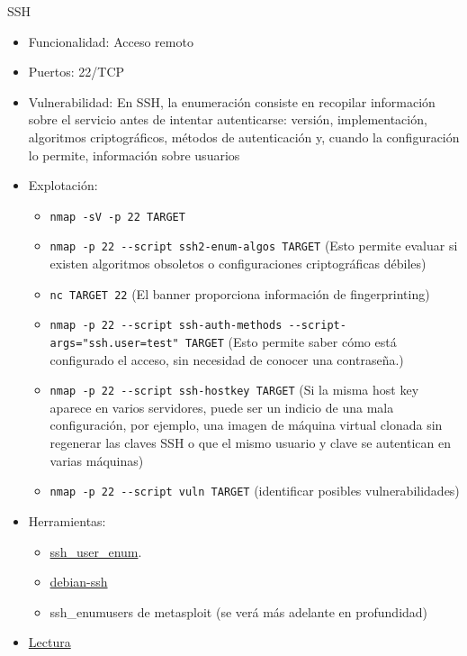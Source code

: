 \documentclass[aspectratio=169,11pt]{beamer}
\newcommand{\cmd}[1]{\texttt{#1}}
\begin{document}
\begin{frame}[allowframebreaks]{SSH}
\small
  \begin{itemize}
  \item Funcionalidad: Acceso remoto
  \item Puertos: 22/TCP
  \item Vulnerabilidad: En SSH, la enumeración consiste en recopilar información sobre el servicio antes de intentar autenticarse: versión, implementación, algoritmos criptográficos, métodos de autenticación y, cuando la configuración lo permite, información sobre usuarios
  \item Explotación:
      \begin{itemize}
      \item \cmd{nmap -sV -p 22 TARGET}
      \item \cmd{nmap -p 22 -{}-script ssh2-enum-algos TARGET} (Esto permite evaluar si existen algoritmos obsoletos o configuraciones criptográficas débiles)
      \item \cmd{nc TARGET 22} (El banner proporciona información de fingerprinting)
      \item \cmd{nmap -p 22 -{}-script ssh-auth-methods -{}-script-args="ssh.user=test" TARGET} (Esto permite saber cómo está configurado el acceso, sin necesidad de conocer una contraseña.)
      \item \cmd{nmap -p 22 -{}-script ssh-hostkey TARGET} (Si la misma host key aparece en varios servidores, puede ser un indicio de una mala configuración, por ejemplo, una imagen de máquina virtual clonada sin regenerar las claves SSH o que el mismo usuario y clave se autentican en varias máquinas)
      \item \cmd{nmap -p 22 -{}-script vuln TARGET} (identificar posibles vulnerabilidades)
      \end{itemize}
  \item Herramientas:
    \begin{itemize}
    \item \href{https://github.com/nccgroup/ssh_user_enum}{ssh\_user\_enum}. 
    \item \href{https://github.com/g0tmi1k/debian-ssh}{debian-ssh}
    \item ssh\_enumusers de metasploit (se verá más adelante en profundidad)
    \end{itemize}
  \item \href{https://www.linkedin.com/feed/update/urn:li:activity:7050015800174288896/}{Lectura}
   \end{itemize}
\end{frame}
\end{document}
